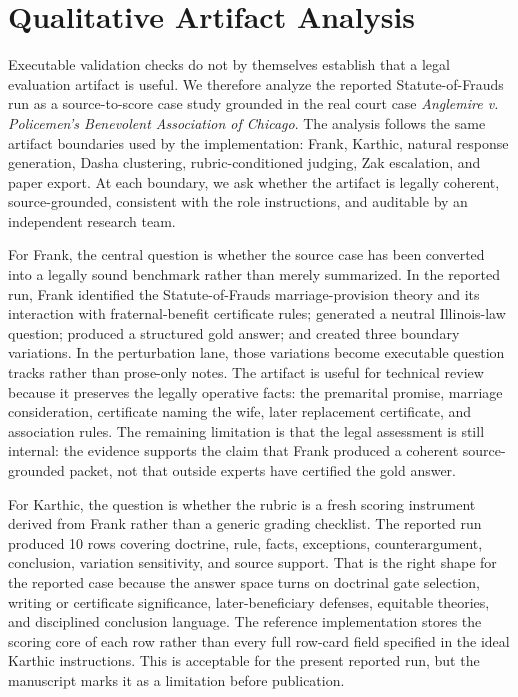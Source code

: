 \section{Qualitative Artifact Analysis}

Executable validation checks do not by themselves establish that a legal
evaluation artifact is useful. We therefore analyze the reported
Statute-of-Frauds run as a source-to-score case study grounded in the real court
case \emph{Anglemire v. Policemen's Benevolent Association of Chicago}. The
analysis follows the same artifact boundaries used by the implementation:
Frank, Karthic, natural response generation, Dasha clustering,
rubric-conditioned judging, Zak escalation, and paper export. At each boundary,
we ask whether the artifact is legally coherent, source-grounded, consistent
with the role instructions, and auditable by an independent research team.

\begin{table}[h]
\centering
\caption{Stage-level artifact assessment for the live SOF case study.}
\label{tab:stage-artifact-assessment}

\end{table}

For Frank, the central question is whether the source case has been converted
into a legally sound benchmark rather than merely summarized. In the reported
run, Frank identified the Statute-of-Frauds marriage-provision theory and its
interaction with fraternal-benefit certificate rules; generated a neutral
Illinois-law question; produced a structured gold answer; and created three
boundary variations. In the perturbation lane, those variations become
executable question tracks rather than prose-only notes. The artifact is useful for technical review because it preserves the
legally operative facts: the premarital promise, marriage consideration,
certificate naming the wife, later replacement certificate, and association
rules. The remaining limitation is that the legal assessment is still internal:
the evidence supports the claim that Frank produced a coherent source-grounded
packet, not that outside experts have certified the gold answer.

For Karthic, the question is whether the rubric is a fresh scoring instrument
derived from Frank rather than a generic grading checklist. The reported run
produced 10 rows covering doctrine, rule, facts, exceptions, counterargument,
conclusion, variation sensitivity, and source support. That is the right shape
for the reported case because the answer space turns on doctrinal gate selection,
writing or certificate significance, later-beneficiary defenses, equitable
theories, and disciplined conclusion language. The reference implementation
stores the scoring core of each row rather than every full row-card field
specified in the ideal Karthic instructions. This is acceptable for the present
reported run, but the manuscript marks it as a limitation before publication.

